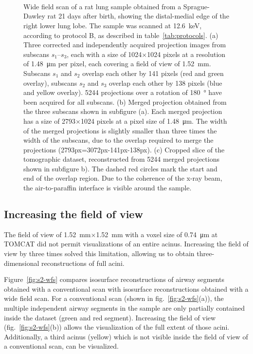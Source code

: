 \begin{figure}
	\centering
	\caption{Wide field scan of a rat lung sample obtained from a Sprague-Dawley rat 21 days after birth, showing the distal-medial edge of the right lower lung lobe. The sample was scanned at \SI{12.6}{\kilo\electronvolt}, according to protocol B, as described in table~\ref{tab:protocols}. %
			(a) Three corrected and independently acquired projection images from subscans $s_1$--$s_3$, each with a size of 1024\(\times\)1024 pixels at a resolution of \SI{1.48}{\micro\meter} per pixel, each covering a field of view of \SI{1.52}{\milli\meter}. Subscans $s_1$ and $s_2$ overlap each other by 141 pixels (red and green overlay), subscans $s_2$ and $s_3$ overlap each other by 138 pixels (blue and yellow overlay). 5244 projections over a rotation of \SI{180}{\degree} have been acquired for all subscans. %
			(b) Merged projection obtained from the three subscans shown in subfigure (a). Each merged projection has a size of 2793\(\times\)1024 pixels at a pixel size of \SI{1.48}{\micro\meter}. The width of the merged projections is slightly smaller than three times the width of the subscans, due to the overlap required to merge the projections (2793px=3072px-141px-138px). %
			(c) Cropped slice of the tomographic dataset, reconstructed from 5244 merged projections shown in subfigure b). The dashed red circles mark the start and end of the overlap region. Due to the coherence of the x-ray beam, the air-to-paraffin interface is visible around the sample.}
	\ifiucr
		\\%
		\\%
		\\%
	\else
	\fi
	\label{fig:wide-field-scan-results}
\end{figure}

\subsection{Increasing the field of view}
The field of view of \SI{1.52}{\milli\meter}$\times$\SI{1.52}{\milli\meter} with a voxel size of \SI{0.74}{\micro\meter} at TOMCAT did not permit visualizations of an entire acinus. Increasing the field of view by three times solved this limitation, allowing us to obtain three-dimensional reconstructions of full acini.

Figure~\ref{fig:s2-wfs} compares isosurface reconstructions of airway segments obtained with a conventional scan with isosurface reconstructions obtained with a wide field scan. For a conventional scan (shown in fig.~\ref{fig:s2-wfs}(a)), the multiple independent airway segments in the sample are only partially contained inside the dataset (green and red segment). Increasing the field of view (fig.~\ref{fig:s2-wfs}(b)) allows the visualization of the full extent of those acini. Additionally, a third acinus (yellow) which is not visible inside the field of view of a conventional scan, can be visualized.

